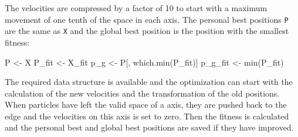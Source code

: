 \documentclass[
  oneside]{book}
\newenvironment{Shaded}{\begin{snugshade}}{\end{snugshade}}
\newcommand{\FunctionTok}[1]{\textcolor[rgb]{0.00,0.00,0.00}{#1}}
\newcommand{\NormalTok}[1]{#1}
\newcommand{\OtherTok}[1]{\textcolor[rgb]{0.56,0.35,0.01}{#1}}
\begin{document}
The velocities are compressed by a factor of 10 to start with a maximum movement of one tenth of the space in each axis. The personal best positions \texttt{P} are the same as \texttt{X} and the global best position is the position with the smallest fitness:

\begin{Shaded}
\begin{Highlighting}[]
\NormalTok{P }\OtherTok{\textless{}{-}}\NormalTok{ X}
\NormalTok{P\_fit }\OtherTok{\textless{}{-}}\NormalTok{ X\_fit}
\NormalTok{p\_g }\OtherTok{\textless{}{-}}\NormalTok{ P[, }\FunctionTok{which.min}\NormalTok{(P\_fit)]}
\NormalTok{p\_g\_fit }\OtherTok{\textless{}{-}} \FunctionTok{min}\NormalTok{(P\_fit)}
\end{Highlighting}
\end{Shaded}

The required data structure is available and the optimization can start with the calculation of the new velocities and the transformation of the old positions. When particles have left the valid space of a axis, they are pushed back to the edge and the velocities on this axis is set to zero. Then the fitness is calculated and the personal best and global best positions are saved if they have improved.
\end{document}
